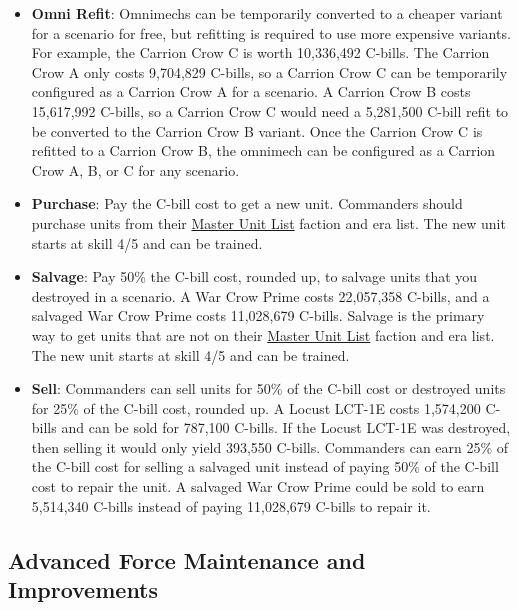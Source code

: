 \documentclass{article}
\begin{document}
\begin{itemize}
\item {\bfseries Omni Refit}: Omnimechs can be temporarily converted to a cheaper variant for a scenario for free, but refitting is required to use more expensive variants.
For example, the Carrion Crow C is worth 10,336,492 C-bills.
The Carrion Crow A only costs 9,704,829 C-bills, so a Carrion Crow C can be temporarily configured as a Carrion Crow A for a scenario.
A Carrion Crow B costs 15,617,992 C-bills, so a Carrion Crow C would need a 5,281,500 C-bill refit to be converted to the Carrion Crow B variant.
Once the Carrion Crow C is refitted to a Carrion Crow B, the omnimech can be configured as a Carrion Crow A, B, or C for any scenario.

\item {\bfseries Purchase}: Pay the C-bill cost to get a new unit.
Commanders should purchase units from their \href{http://www.masterunitlist.info}{Master Unit List} faction and era list.
The new unit starts at skill 4/5 and can be trained.

\item {\bfseries Salvage}: Pay 50\% the C-bill cost, rounded up, to salvage units that you destroyed in a scenario.
A War Crow Prime costs 22,057,358 C-bills, and a salvaged War Crow Prime costs 11,028,679 C-bills.
Salvage is the primary way to get units that are not on their \href{http://www.masterunitlist.info}{Master Unit List} faction and era list.
The new unit starts at skill 4/5 and can be trained.

\item {\bfseries Sell}: Commanders can sell units for 50\% of the C-bill cost or destroyed units for 25\% of the C-bill cost, rounded up.
A Locust LCT-1E costs 1,574,200 C-bills and can be sold for 787,100 C-bills.
If the Locust LCT-1E was destroyed, then selling it would only yield 393,550 C-bills.
Commanders can earn 25\% of the C-bill cost for selling a salvaged unit instead of paying 50\% of the C-bill cost to repair the unit.
A salvaged War Crow Prime could be sold to earn 5,514,340 C-bills instead of paying 11,028,679 C-bills to repair it.

\end{itemize}

\newpage

\subsection{Advanced Force Maintenance and Improvements}
\end{document}
